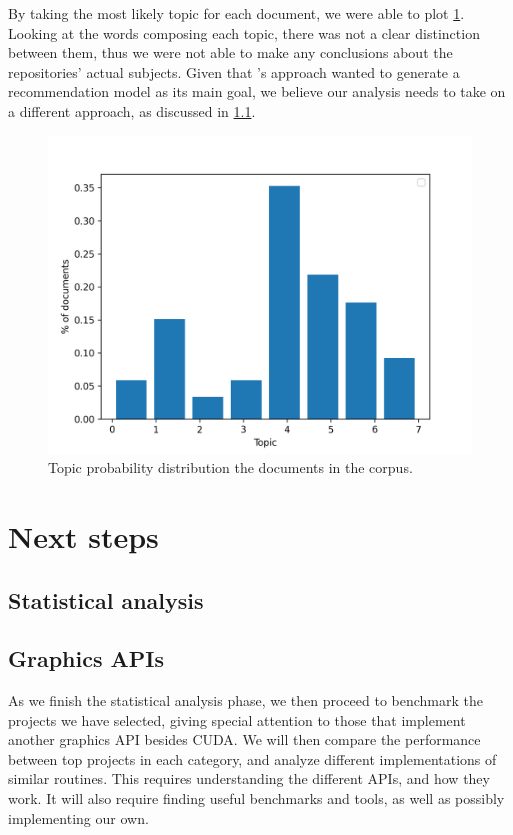 \documentclass[11pt, conference, onecolumn, final]{IEEEtran}
\begin{document}
By taking the most likely topic for each document, we were able to plot
\cref{fig:topic-probabilities}.
Looking at the words composing each topic, there was not a clear distinction
between them, thus we were not able to make any conclusions about the
repositories' actual subjects.
Given that \cite{zheng2018measuring}'s approach wanted to generate a
recommendation model as its main goal, we believe our analysis needs to take on
a different approach, as discussed in \cref{sec:next-steps:statistics}.

\begin{figure}[H]
    \centering
    \includegraphics[width=0.7\linewidth]{topic-probabilities.png}
    \caption{Topic probability distribution the documents in the corpus.}
    \label{fig:topic-probabilities}
\end{figure}

\section{Next steps} \label{sec:next-steps}

\subsection{Statistical analysis} \label{sec:next-steps:statistics}


\subsection{Graphics APIs} \label{sec:next-steps-apis}

As we finish the statistical analysis phase, we then proceed to benchmark the
projects we have selected, giving special attention to those that implement
another graphics API besides CUDA.
We will then compare the performance between top projects in each category, and
analyze different implementations of similar routines.
This requires understanding the different APIs, and how they work.
It will also require finding useful benchmarks and tools, as well as possibly
implementing our own.
\end{document}

